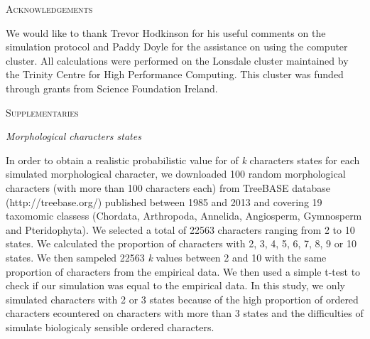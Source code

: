 \documentclass[12pt,letterpaper]{article}
\renewcommand{\section}[1]{%
\bigskip
\begin{center}
\begin{Large}
\normalfont\scshape #1
\medskip
\end{Large}
\end{center}}
\renewcommand{\subsection}[1]{%
\bigskip
\begin{center}
\begin{large}
\normalfont\itshape #1
\end{large}
\end{center}}
\begin{document}
\section{Acknowledgements}
We would like to thank Trevor Hodkinson %
for his useful comments on the simulation protocol and Paddy Doyle for the assistance on using the computer cluster.
All calculations were performed on the Lonsdale cluster maintained by the Trinity Centre for High Performance Computing.
This cluster was funded through grants from Science Foundation Ireland.



\section{Supplementaries}
\label{supplementaries}
\subsection{Morphological characters states}
In order to obtain a realistic probabilistic value for of \textit{k} characters states for each simulated morphological character, we downloaded 100 random morphological characters (with more than 100 characters each) from TreeBASE database (http://treebase.org/) published between 1985 and 2013 and covering 19 taxomomic classess (Chordata, Arthropoda, Annelida, Angiosperm, Gymnosperm and Pteridophyta).
We selected a total of 22563 characters ranging from 2 to 10 states.
We calculated the proportion of characters with 2, 3, 4, 5, 6, 7, 8, 9 or 10 states.
We then sampeled 22563 \textit{k} values between 2 and 10 with the same proportion of characters from the empirical data.
We then used a simple t-test to check if our simulation was equal to the empirical data.
In this study, we only simulated characters with 2 or 3 states because of the high proportion of ordered characters ecountered on characters with more than 3 states and the difficulties of simulate biologicaly sensible ordered characters.
\end{document}
